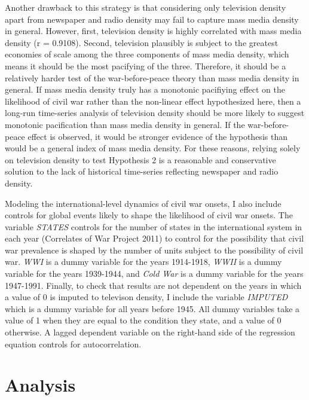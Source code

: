 \documentclass[11pt,article,oneside]{memoir}
\begin{document}
Another drawback to this strategy is that considering only television
density apart from newspaper and radio density may fail to capture mass
media density in general. However, first, television density is highly
correlated with mass media density (r = 0.9108). Second, television
plausibly is subject to the greatest economies of scale among the three
components of mass media density, which means it should be the most
pacifying of the three. Therefore, it should be a relatively harder test
of the war-before-peace theory than mass media density in general. If
mass media density truly has a monotonic pacifiying effect on the
likelihood of civil war rather than the non-linear effect hypothesized
here, then a long-run time-series analysis of television density should
be more likely to suggest monotonic pacification than mass media density
in general. If the war-before-peace effect is observed, it would be
stronger evidence of the hypothesis than would be a general index of
mass media density. For these reasons, relying solely on television
density to test Hypothesis 2 is a reasonable and conservative solution
to the lack of historical time-series reflecting newspaper and radio
density.

Modeling the international-level dynamics of civil war onsets, I also
include controls for global events likely to shape the likelihood of
civil war onsets. The variable \emph{STATES} controls for the number of
states in the international system in each year (Correlates of War
Project 2011) to control for the possibility that civil war prevalence
is shaped by the number of units subject to the possibility of civil
war. \emph{WWI} is a dummy variable for the years 1914-1918, \emph{WWII}
is a dummy variable for the years 1939-1944, and \emph{Cold War} is a
dummy variable for the years 1947-1991. Finally, to check that results
are not dependent on the years in which a value of 0 is imputed to
televison density, I include the variable \emph{IMPUTED} which is a
dummy variable for all years before 1945. All dummy variables take a
value of 1 when they are equal to the condition they state, and a value
of 0 otherwise. A lagged dependent variable on the right-hand side of
the regression equation controls for autocorrelation.

\section{Analysis}\label{analysis}
\end{document}
